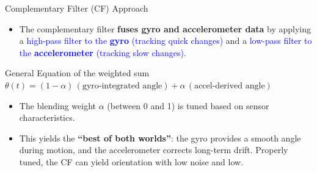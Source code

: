 \documentclass[aspectratio=169,xcolor=dvipsnames]{beamer}
\begin{document}
\begin{frame}{Complementary Filter (CF) Approach}
\begin{itemize}
  \item The complementary filter \textbf{fuses gyro and accelerometer data} by applying a \textcolor{blue}{high-pass filter to the \textbf{gyro} (tracking quick changes)} and a \textcolor{blue}{low-pass filter to the \textbf{accelerometer} (tracking slow changes)}\cite{compfilter}.
\end{itemize}
\begin{block}{General Equation of the weighted sum}
    \textbf{$\theta(t)=(1 - \alpha)\,(\text{gyro-integrated angle}) + \alpha\,(\text{accel-derived angle})$}
\end{block}
\begin{itemize}
  \item The blending weight \textbf{$\alpha$} (between 0 and 1) is tuned based on sensor characteristics. 
  \item This yields the \textbf{“best of both worlds”}: the gyro provides a smooth angle during motion, and the accelerometer corrects long-term drift. Properly tuned, the CF can yield orientation with low noise and low.
\end{itemize}
\end{frame}
\end{document}
